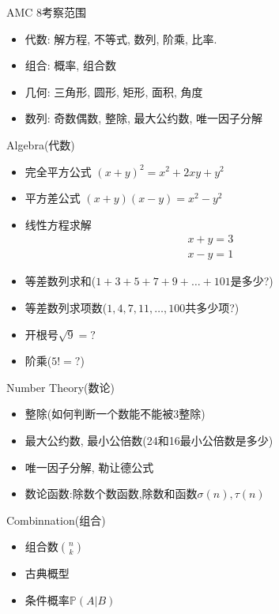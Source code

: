 \documentclass{beamer}
\theoremstyle{definition}
\begin{document}
\begin{frame}{AMC 8考察范围}
    \begin{itemize}
        \item 代数: 解方程, 不等式, 数列, 阶乘, 比率.
        \item 组合: 概率, 组合数
        \item 几何: 三角形, 圆形, 矩形, 面积, 角度
        \item 数列: 奇数偶数, 整除, 最大公约数, 唯一因子分解
    \end{itemize}
\end{frame}
\begin{frame}{Algebra(代数)}
    \begin{itemize}
        \item 完全平方公式 $(x+y)^2=x^2+2xy+y^2$
        \item 平方差公式 $(x+y)(x-y)=x^2-y^2$
        \item 线性方程求解
              \begin{align*}
                  x+y=3 & \\
                  x-y=1 &
              \end{align*}
        \item 等差数列求和($1+3+5+7+9+\dots+101$是多少?)
        \item 等差数列求项数($1,4,7,11,\dots,100$共多少项?)
        \item 开根号$\sqrt{9}=?$
        \item 阶乘($5!=?$)
    \end{itemize}
\end{frame}
\begin{frame}{Number Theory(数论)}
    \begin{itemize}
        \item 整除(如何判断一个数能不能被3整除)
        \item 最大公约数, 最小公倍数(24和16最小公倍数是多少)
        \item 唯一因子分解, 勒让德公式
        \item 数论函数:除数个数函数,除数和函数$\sigma(n),\tau (n)$
    \end{itemize}
\end{frame}
\begin{frame}{Combinnation(组合)}
\begin{itemize}
    \item 组合数$\binom{n}{k}$
    \item 古典概型
    \item 条件概率$\mathbb{P}(A|B)$
\end{itemize}
\end{frame}
\end{document}
